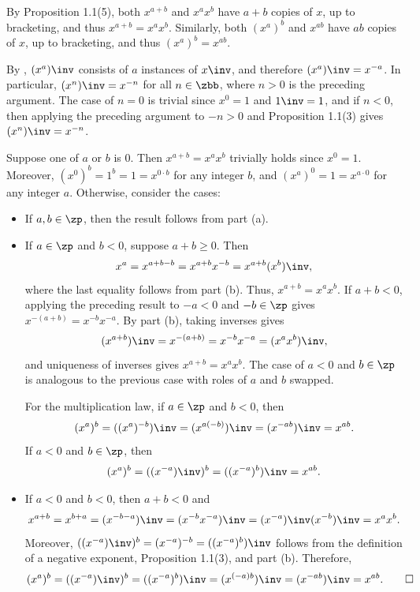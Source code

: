\begin{solenum}
    \item By Proposition 1.1(5), both $x^{a+b}$ and $x^a x^b$ have ${a+b}$ copies of $x$, up to bracketing, and thus $x^{a+b} = x^a x^b$.
    Similarly, both $(x^a)^b$ and $x^{ab}$ have $ab$ copies of $x$, up to bracketing, and thus $(x^a)^b = x^{ab}$.
    \item By , $(x^a)\inv$ consists of $a$ instances of $x\inv$, and therefore $(x^a)\inv = x^{-a}$.
    In particular, $(x^n)\inv = x^{-n}$ for all $n \in \zbb$, where $n > 0$ is the preceding argument.
    The case of $n = 0$ is trivial since $x^0 = 1$ and $1\inv = 1$, and if $n < 0$, then applying the preceding argument to $-n > 0$ and Proposition 1.1(3) gives $(x^n)\inv = x^{-n}$.
    \item Suppose one of $a$ or $b$ is $0$.
    Then $x^{a+b} = x^a x^b$ trivially holds since $x^0 = 1$.
    Moreover, $(x^0)^b = 1^b = 1 = x^{0 \cdot b}$ for any integer $b$, and $(x^a)^0 = 1 = x^{a \cdot 0}$ for any integer $a$.
    Otherwise, consider the cases:
    \begin{itemize}
        \item If $a, b \in \zp$, then the result follows from part (a).
        \item If $a \in \zp$ and $b < 0$, suppose $a + b \geq 0$.
        Then
        \[
            x^a = x^{a+b-b} = x^{a+b} x^{-b} = x^{a+b} (x^b)\inv,
        \]
        where the last equality follows from part (b).
        Thus, $x^{a+b} = x^a x^b$.
        If $a + b < 0$, applying the preceding result to $-a < 0$ and $-b \in \zp$ gives $x^{-(a+b)} = x^{-b} x^{-a}$.
        By part (b), taking inverses gives
        \[
            (x^{a+b})\inv = x^{-(a+b)} = x^{-b} x^{-a} = (x^a x^b)\inv,
        \]
        and uniqueness of inverses gives $x^{a+b} = x^a x^b$.
        The case of $a < 0$ and $b \in \zp$ is analogous to the previous case with roles of $a$ and $b$ swapped.

        For the multiplication law, if $a \in \zp$ and $b < 0$, then
        \[
            (x^a)^b = ((x^a)^{-b})\inv = (x^{a(-b)})\inv = (x^{-ab})\inv = x^{ab}.
        \]
        If $a < 0$ and $b \in \zp$, then
        \[
            (x^a)^b = ((x^{-a})\inv)^b = ((x^{-a})^b)\inv = x^{ab}.
        \]
        \item If $a < 0$ and $b < 0$, then $a + b < 0$ and
        \[
        	x^{a + b} = x^{b + a} = (x^{-b - a})\inv = (x^{-b} x^{-a})\inv = (x^{-a})\inv (x^{-b})\inv = x^a x^b.
        \]
        Moreover, $((x^{-a})\inv)^b = (x^{-a})^{-b} = ((x^{-a})^b)\inv$ follows from the definition of a negative exponent, Proposition 1.1(3), and part (b).
        Therefore,
        \[
            (x^a)^b = ((x^{-a})\inv)^b = ((x^{-a})^b)\inv = (x^{(-a)b})\inv = (x^{-ab})\inv = x^{ab}. \qedhere
        \]
    \end{itemize}
\end{solenum}

